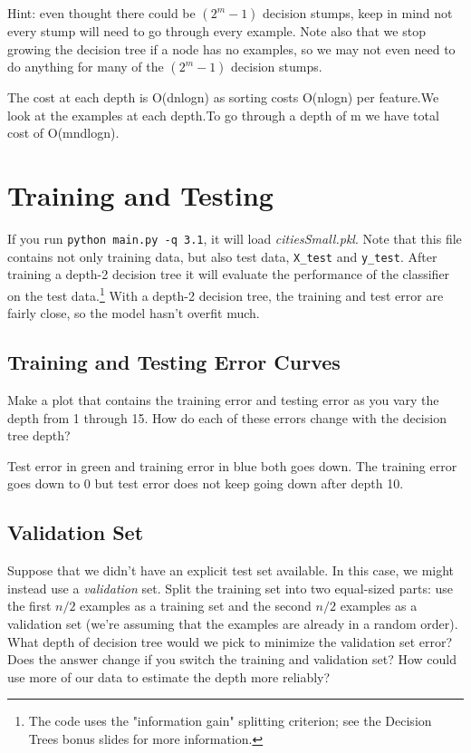 \documentclass{article}
\def\blu#1{{\color{blu}#1}}
\def\gre#1{{\color{gre}#1}}
\begin{document}
Hint: even thought there could be $(2^m-1)$ decision stumps, keep in mind not every stump will need to go through every example. Note also that we stop growing the decision tree if a node has no examples, so we may not even need to do anything for many of the $(2^m-1)$ decision stumps.

\gre{The cost at each depth is O(dnlogn) as sorting costs O(nlogn) per feature.We look at the examples at each depth.To go through a depth of m we have total cost of O(mndlogn).}


\section{Training and Testing}
If you run \texttt{python main.py \string-q 3.1}, it will load \emph{citiesSmall.pkl}.
Note that this file contains not only training data, but also test data, \texttt{X\string_test} and \texttt{y\string_test}.
After training a depth-2 decision tree it will evaluate the performance of the classifier on the test data.\footnote{The code uses the "information gain" splitting criterion; see the Decision Trees bonus slides for more information.} With a depth-2 decision tree, the training and test error are fairly close, so the model hasn't overfit much.

\subsection{Training and Testing Error Curves}

\blu{Make a plot that contains the training error and testing error as you vary the depth from 1 through 15. How do each of these errors change with the decision tree depth?}

\gre{Test error in green and training error in blue both goes down. The training error goes down to 0 but test error does not keep going down after depth 10.}

\subsection{Validation Set}

Suppose that we didn't have an explicit test set available. In this case, we might instead use a \emph{validation} set. Split the training set into two equal-sized parts: use the first $n/2$ examples as a training set and the second $n/2$ examples as a validation set (we're assuming that the examples are already in a random order). \blu{What depth of decision tree would we pick to minimize the validation set error? Does the answer change if you switch the training and validation set? How could use more of our data to  estimate the depth more reliably?}
\end{document}
